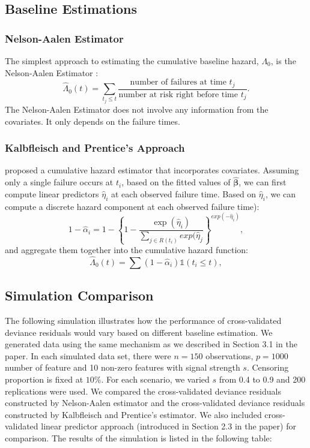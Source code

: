 \documentclass{article}
\newcommand{\bbeta}{\boldsymbol{\beta}}
\begin{document}
\subsection{Baseline Estimations}

	\subsubsection{Nelson-Aalen Estimator}
	 The simplest approach to estimating the cumulative baseline hazard, $\Lambda_0$, is the Nelson-Aalen Estimator \citep{nelson1969, aalen1978}:
\begin{equation}
  \hat{\Lambda}_{0}(t) = \sum_{t_j \leq t}\frac{\text{number of failures at time } t_j}{\text{number at risk right before time }t_j}.
\end{equation}
	The Nelson-Aalen Estimator does not involve any information from the covariates. It only depends on the failure times.

	\subsubsection{Kalbfleisch and Prentice's Approach}					
	\cite{Kalbfleisch2011} proposed a cumulative hazard estimator that incorporates covariates. Assuming only a single failure occurs at $t_i$, based on the fitted values of $\hat{\bbeta}$, we can first compute linear predictors $\hat{\eta}_i$ at each observed failure time. Based on $\hat{\eta}_i$, we can compute a discrete hazard component at each observed failure time):
\begin{equation}
1 - \hat{\alpha}_{i} = 1 - \left\{ 1 - \frac{\exp (\hat{\eta}_{i})}{\sum_{ j \in R(t_{i})}exp (\hat{\eta}_{j}} \right\}^{exp(-\hat{\eta}_{i})},
\end{equation}
and aggregate them together into the cumulative hazard function:
\begin{equation} 
\hat{\Lambda}_0(t) = \sum(1 - \hat{\alpha}_i)\mathds{1}(t_{i} \leq t),
\end{equation}

\subsection{Simulation Comparison}
The following simulation illustrates how the performance of cross-validated deviance residuals would vary based on different baseline estimation. We generated data using the same mechanism as we described in Section 3.1 in the paper. In each simulated data set, there were $n = 150$ observations, $p = 1000$ number of feature and 10 non-zero features with signal strength $s$. Censoring proportion is fixed at $10\%$. For each scenario, we varied $s$ from 0.4 to 0.9 and 200 replications were used. We compared the cross-validated deviance residuals constructed by Nelson-Aalen estimator and the cross-validated deviance residuals constructed by Kalbfleisch and Prentice's estimator. We also included cross-validated linear predictor approach (introduced in Section 2.3 in the paper) for comparison. The results of the simulation is listed in the following table:
\end{document}
